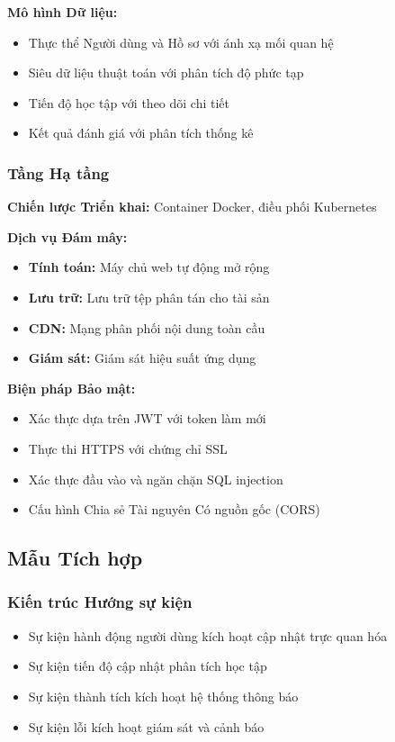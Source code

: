 \textbf{Mô hình Dữ liệu:}
\begin{itemize}
    \item Thực thể Người dùng và Hồ sơ với ánh xạ mối quan hệ
    \item Siêu dữ liệu thuật toán với phân tích độ phức tạp
    \item Tiến độ học tập với theo dõi chi tiết
    \item Kết quả đánh giá với phân tích thống kê
\end{itemize}

\subsubsection{Tầng Hạ tầng}
\textbf{Chiến lược Triển khai:} Container Docker, điều phối Kubernetes

\textbf{Dịch vụ Đám mây:}
\begin{itemize}
    \item \textbf{Tính toán:} Máy chủ web tự động mở rộng
    \item \textbf{Lưu trữ:} Lưu trữ tệp phân tán cho tài sản
    \item \textbf{CDN:} Mạng phân phối nội dung toàn cầu
    \item \textbf{Giám sát:} Giám sát hiệu suất ứng dụng
\end{itemize}

\textbf{Biện pháp Bảo mật:}
\begin{itemize}
    \item Xác thực dựa trên JWT với token làm mới
    \item Thực thi HTTPS với chứng chỉ SSL
    \item Xác thực đầu vào và ngăn chặn SQL injection
    \item Cấu hình Chia sẻ Tài nguyên Có nguồn gốc (CORS)
\end{itemize}

\subsection{Mẫu Tích hợp}

\subsubsection{Kiến trúc Hướng sự kiện}
\begin{itemize}
    \item Sự kiện hành động người dùng kích hoạt cập nhật trực quan hóa
    \item Sự kiện tiến độ cập nhật phân tích học tập
    \item Sự kiện thành tích kích hoạt hệ thống thông báo
    \item Sự kiện lỗi kích hoạt giám sát và cảnh báo
\end{itemize}

